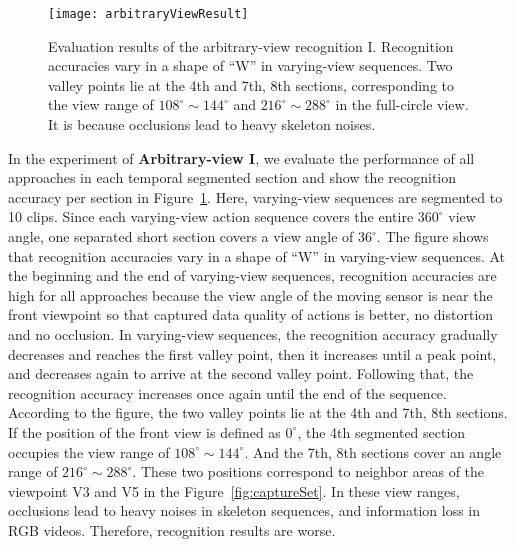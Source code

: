 \documentclass[journal]{IEEEtran}
\begin{document}
\begin{figure}[t]
\begin{center}
\texttt{[image: arbitraryViewResult]}
\end{center}
   \caption{Evaluation results of the arbitrary-view recognition I. Recognition accuracies vary in a shape of ``W'' in varying-view sequences. Two valley points lie at the 4th and 7th, 8th sections, corresponding to the view range of $108^\circ \sim  144^\circ$ and $216^\circ \sim 288^\circ$ in the full-circle view. It is because occlusions lead to heavy skeleton noises.}
\label{fig:arbitrary}
\end{figure}

In the experiment of \textbf{Arbitrary-view I}, we evaluate the performance of all approaches in each temporal segmented section and show the recognition accuracy per section in Figure~\ref{fig:arbitrary}. Here, varying-view sequences are segmented to 10 clips. Since each varying-view action sequence covers the entire $360^\circ$ view angle, one separated short section covers a view angle of $36^\circ$.
The figure shows that recognition accuracies vary in a shape of ``W'' in varying-view sequences. At the beginning and the end of varying-view sequences, recognition accuracies are high for all approaches because the view angle of the moving sensor is near the front viewpoint so that captured data quality of actions is better, no distortion and no occlusion. In varying-view sequences, the recognition accuracy gradually decreases and reaches the first valley point, then it increases until a peak point, and decreases again to arrive at the second valley point. Following that, the recognition accuracy increases once again until the end of the sequence. According to the figure, the two valley points lie at the 4th and 7th, 8th sections. If the position of the front view is defined as $0^\circ$, the 4th segmented section occupies the view range of $108^\circ \sim  144^\circ$. And the 7th, 8th sections cover an angle range of $216^\circ \sim 288^\circ$. These two positions correspond to neighbor areas of the viewpoint V3 and V5 in the Figure~\ref{fig:captureSet}. In these view ranges, occlusions lead to heavy noises in skeleton sequences, and information loss in RGB videos. Therefore, recognition results are worse.
\end{document}
